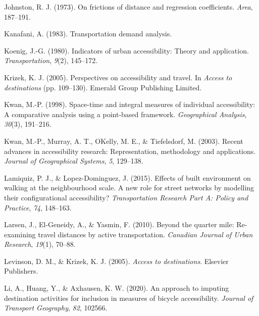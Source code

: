 \documentclass[
11pt, %
oneside, %
english, %
singlespacing, %
]{macthesis} %
\newlength{\cslhangindent}
\newenvironment{CSLReferences}[2] %
 {%
  \setlength{\parindent}{0pt}
  \ifodd #1 \everypar{\setlength{\hangindent}{\cslhangindent}}\ignorespaces\fi
  \ifnum #2 > 0
  \setlength{\parskip}{#2\baselineskip}
  \fi
 }%
 {}
\begin{document}
\begin{CSLReferences}{1}{0}
\leavevmode{}%
Johnston, R. J. (1973). On frictions of distance and regression coefficients. \emph{Area}, 187--191.

\leavevmode{}%
Kanafani, A. (1983). Transportation demand analysis.

\leavevmode{}%
Koenig, J.-G. (1980). Indicators of urban accessibility: Theory and application. \emph{Transportation}, \emph{9}(2), 145--172.

\leavevmode{}%
Krizek, K. J. (2005). Perspectives on accessibility and travel. In \emph{Access to destinations} (pp. 109--130). Emerald Group Publishing Limited.

\leavevmode{}%
Kwan, M.-P. (1998). Space-time and integral measures of individual accessibility: A comparative analysis using a point-based framework. \emph{Geographical Analysis}, \emph{30}(3), 191--216.

\leavevmode{}%
Kwan, M.-P., Murray, A. T., OKelly, M. E., \& Tiefelsdorf, M. (2003). Recent advances in accessibility research: Representation, methodology and applications. \emph{Journal of Geographical Systems}, \emph{5}, 129--138.

\leavevmode{}%
Lamiquiz, P. J., \& Lopez-Dominguez, J. (2015). Effects of built environment on walking at the neighbourhood scale. A new role for street networks by modelling their configurational accessibility? \emph{Transportation Research Part A: Policy and Practice}, \emph{74}, 148--163.

\leavevmode{}%
Larsen, J., El-Geneidy, A., \& Yasmin, F. (2010). Beyond the quarter mile: Re-examining travel distances by active transportation. \emph{Canadian Journal of Urban Research}, \emph{19}(1), 70--88.

\leavevmode{}%
Levinson, D. M., \& Krizek, K. J. (2005). \emph{Access to destinations}. Elsevier Publishers.

\leavevmode{}%
Li, A., Huang, Y., \& Axhausen, K. W. (2020). An approach to imputing destination activities for inclusion in measures of bicycle accessibility. \emph{Journal of Transport Geography}, \emph{82}, 102566.


\end{CSLReferences}
\end{document}
